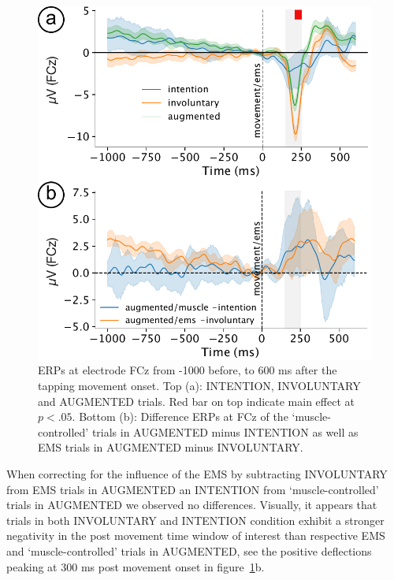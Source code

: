 \begin{figure}[h]
    \centering
    \includegraphics[width=\columnwidth]{figures/PE_erp.pdf}
    \caption{ERPs at electrode FCz from -1000 before, to 600 ms after the tapping movement onset. Top (a): INTENTION, INVOLUNTARY and AUGMENTED trials. Red bar on top indicate main effect at $p<.05$. Bottom (b): Difference ERPs at FCz of the `muscle-controlled' trials in AUGMENTED minus INTENTION as well as EMS trials in AUGMENTED minus INVOLUNTARY.}
    \label{fig:erp}
\end{figure}

When correcting for the influence of the EMS by subtracting INVOLUNTARY from EMS trials in AUGMENTED an INTENTION from `muscle-controlled' trials in AUGMENTED we observed no differences. Visually, it appears that trials in both INVOLUNTARY and INTENTION condition exhibit a stronger negativity in the post movement time window of interest than respective EMS and `muscle-controlled' trials in AUGMENTED, see the positive deflections peaking at 300 ms post movement onset in figure~\ref{fig:erp}b.









